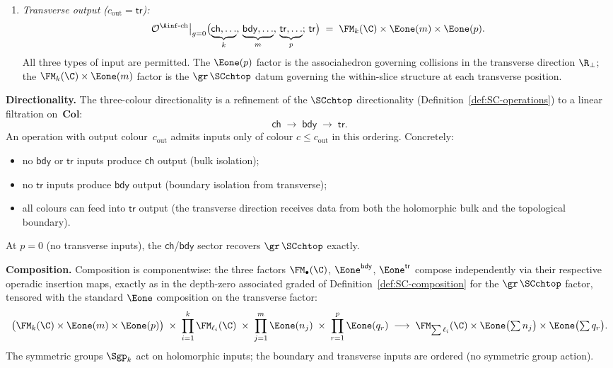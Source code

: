 \begin{construction}
\begin{enumerate}[label=\textup{(G\arabic*)}]
\item \emph{Transverse output
 ($c_{\mathrm{out}} = \mathsf{tr}$):}
 \begin{equation}\label{eq:genus0-triple-ops}
 \mathcal{O}^{\Ainf\text{-ch}}\big|_{g=0}
 \bigl(
 \underbrace{\mathsf{ch},\ldots}_{k},\,
 \underbrace{\mathsf{bdy},\ldots}_{m},\,
 \underbrace{\mathsf{tr},\ldots}_{p};\,\mathsf{tr}
 \bigr)
 \;=\; \FM_k(\C) \times \Eone(m) \times \Eone(p).
 \end{equation}
 All three types of input are permitted. The $\Eone(p)$ factor
 is the associahedron governing collisions in the transverse
 direction $\R_{\perp}$; the $\FM_k(\C) \times \Eone(m)$
 factor is the $\gr\,\SCchtop$ datum governing the within-slice
 structure at each transverse position.
\end{enumerate}

\medskip\noindent
\textbf{Directionality.}
The three-colour directionality is a refinement of the
$\SCchtop$ directionality
(Definition~\ref{def:SC-operations}) to a linear filtration
on~$\mathbf{Col}$:
\[
 \mathsf{ch}
 \;\longrightarrow\;
 \mathsf{bdy}
 \;\longrightarrow\;
 \mathsf{tr}.
\]
An operation with output colour~$c_{\mathrm{out}}$ admits
inputs only of colour $c \le c_{\mathrm{out}}$ in this
ordering. Concretely:
\begin{itemize}
\item no $\mathsf{bdy}$ or $\mathsf{tr}$ inputs produce
 $\mathsf{ch}$ output (bulk isolation);
\item no $\mathsf{tr}$ inputs produce $\mathsf{bdy}$ output
 (boundary isolation from transverse);
\item all colours can feed into $\mathsf{tr}$ output (the
 transverse direction receives data from both the holomorphic
 bulk and the topological boundary).
\end{itemize}
At $p=0$ (no transverse inputs), the
$\mathsf{ch}$/$\mathsf{bdy}$ sector recovers $\gr\,\SCchtop$
exactly.

\medskip\noindent
\textbf{Composition.}
Composition is componentwise: the three factors $\FM_\bullet(\C)$,
$\Eone^{\mathsf{bdy}}$, $\Eone^{\mathsf{tr}}$ compose
independently via their respective operadic insertion maps,
exactly as in the depth-zero associated graded of
Definition~\ref{def:SC-composition} for the
$\gr\,\SCchtop$ factor, tensored with the standard $\Eone$ composition
on the transverse factor:
\[
 \bigl(\FM_k(\C) \times \Eone(m) \times \Eone(p)\bigr)
 \;\times\;
 \prod_{i=1}^{k} \FM_{\ell_i}(\C)
 \;\times\;
 \prod_{j=1}^{m} \Eone(n_j)
 \;\times\;
 \prod_{r=1}^{p} \Eone(q_r)
 \;\longrightarrow\;
 \FM_{\sum\ell_i}(\C)
 \times \Eone\bigl(\textstyle\sum n_j\bigr)
 \times \Eone\bigl(\textstyle\sum q_r\bigr).
\]
The symmetric groups $\Sgp_k$ act on holomorphic inputs; the
boundary and transverse inputs are ordered (no symmetric group
action).


\end{construction}
